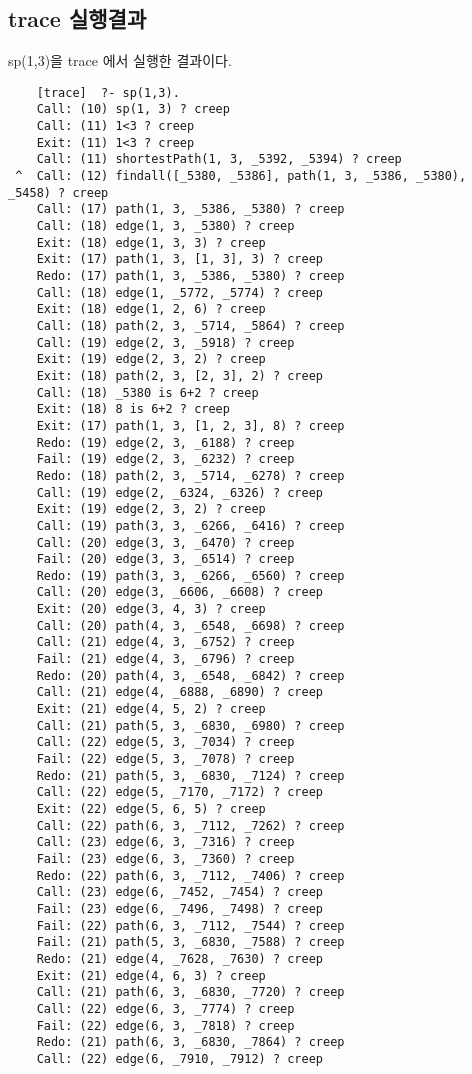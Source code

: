 \documentclass{article}
\begin{document}
\subsection{trace 실행결과}
sp(1,3)을 trace 에서 실행한 결과이다.
\begin{lstlisting}
	[trace]  ?- sp(1,3).
	Call: (10) sp(1, 3) ? creep
	Call: (11) 1<3 ? creep
	Exit: (11) 1<3 ? creep
	Call: (11) shortestPath(1, 3, _5392, _5394) ? creep
 ^  Call: (12) findall([_5380, _5386], path(1, 3, _5386, _5380), _5458) ? creep
	Call: (17) path(1, 3, _5386, _5380) ? creep
	Call: (18) edge(1, 3, _5380) ? creep
	Exit: (18) edge(1, 3, 3) ? creep
	Exit: (17) path(1, 3, [1, 3], 3) ? creep
	Redo: (17) path(1, 3, _5386, _5380) ? creep
	Call: (18) edge(1, _5772, _5774) ? creep
	Exit: (18) edge(1, 2, 6) ? creep
	Call: (18) path(2, 3, _5714, _5864) ? creep
	Call: (19) edge(2, 3, _5918) ? creep
	Exit: (19) edge(2, 3, 2) ? creep
	Exit: (18) path(2, 3, [2, 3], 2) ? creep
	Call: (18) _5380 is 6+2 ? creep
	Exit: (18) 8 is 6+2 ? creep
	Exit: (17) path(1, 3, [1, 2, 3], 8) ? creep
	Redo: (19) edge(2, 3, _6188) ? creep
	Fail: (19) edge(2, 3, _6232) ? creep
	Redo: (18) path(2, 3, _5714, _6278) ? creep
	Call: (19) edge(2, _6324, _6326) ? creep
	Exit: (19) edge(2, 3, 2) ? creep
	Call: (19) path(3, 3, _6266, _6416) ? creep
	Call: (20) edge(3, 3, _6470) ? creep
	Fail: (20) edge(3, 3, _6514) ? creep
	Redo: (19) path(3, 3, _6266, _6560) ? creep
	Call: (20) edge(3, _6606, _6608) ? creep
	Exit: (20) edge(3, 4, 3) ? creep
	Call: (20) path(4, 3, _6548, _6698) ? creep
	Call: (21) edge(4, 3, _6752) ? creep
	Fail: (21) edge(4, 3, _6796) ? creep
	Redo: (20) path(4, 3, _6548, _6842) ? creep
	Call: (21) edge(4, _6888, _6890) ? creep
	Exit: (21) edge(4, 5, 2) ? creep
	Call: (21) path(5, 3, _6830, _6980) ? creep
	Call: (22) edge(5, 3, _7034) ? creep
	Fail: (22) edge(5, 3, _7078) ? creep
	Redo: (21) path(5, 3, _6830, _7124) ? creep
	Call: (22) edge(5, _7170, _7172) ? creep
	Exit: (22) edge(5, 6, 5) ? creep
	Call: (22) path(6, 3, _7112, _7262) ? creep
	Call: (23) edge(6, 3, _7316) ? creep
	Fail: (23) edge(6, 3, _7360) ? creep
	Redo: (22) path(6, 3, _7112, _7406) ? creep
	Call: (23) edge(6, _7452, _7454) ? creep
	Fail: (23) edge(6, _7496, _7498) ? creep
	Fail: (22) path(6, 3, _7112, _7544) ? creep
	Fail: (21) path(5, 3, _6830, _7588) ? creep
	Redo: (21) edge(4, _7628, _7630) ? creep
	Exit: (21) edge(4, 6, 3) ? creep
	Call: (21) path(6, 3, _6830, _7720) ? creep
	Call: (22) edge(6, 3, _7774) ? creep
	Fail: (22) edge(6, 3, _7818) ? creep
	Redo: (21) path(6, 3, _6830, _7864) ? creep
	Call: (22) edge(6, _7910, _7912) ? creep

\end{lstlisting}
\end{document}
